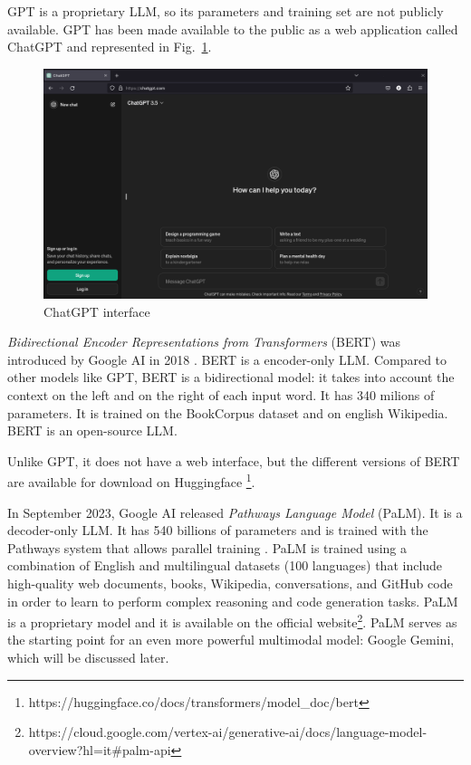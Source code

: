 GPT is a proprietary LLM, so its parameters and training set are not publicly available.
GPT has been made available to the public as a web application called ChatGPT and represented in Fig.~\ref{fig:18}.

\begin{figure}[H]
    \centering
    \includegraphics[width=0.9\linewidth]{Figures/fig_18.png}
    \caption{ChatGPT interface}
    \label{fig:18}
\end{figure}

\textit{Bidirectional Encoder Representations from Transformers} (BERT) was introduced by Google AI in 2018 \cite{kenton2019bert}.
BERT is a encoder-only LLM.
Compared to other models like GPT, BERT is a bidirectional model: it takes into account the context on the left and on the right of each input word.
It has 340 milions of parameters.
It is trained on the BookCorpus dataset \cite{bandy2021addressing} and on english Wikipedia. BERT is an open-source LLM.

Unlike GPT, it does not have a web interface, but the different versions of BERT are available for download on Huggingface \footnote{https://huggingface.co/docs/transformers/model\_doc/bert}.

In September 2023, Google AI released \textit{Pathways Language Model} (PaLM).
It is a decoder-only LLM.
It has 540 billions of parameters and is trained with the Pathways system that allows parallel training \cite{anil2023palm,barham2022pathways}.
PaLM is trained using a combination of English and multilingual datasets (100 languages) that include high-quality web documents, books, Wikipedia, conversations, and GitHub code in order to learn to perform complex reasoning and code generation tasks\cite{palm2_intro}.
PaLM is a proprietary model and it is available on the official website\footnote{https://cloud.google.com/vertex-ai/generative-ai/docs/language-model-overview?hl=it\#palm-api}.
PaLM serves as the starting point for an even more powerful multimodal model: Google Gemini, which will be discussed later.

